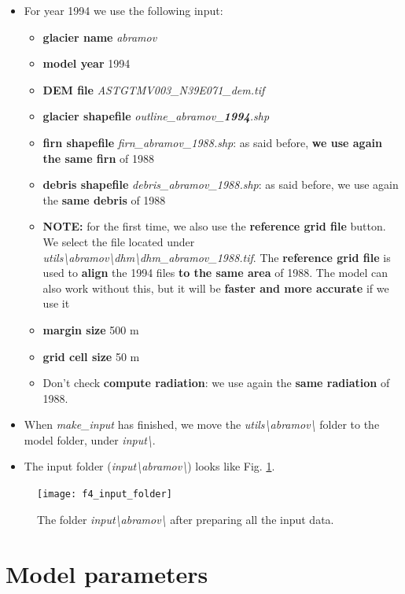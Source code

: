 \documentclass[15pt]{extarticle}
\begin{document}
\begin{itemize}
    \item For year 1994 we use the following input:
        \begin{itemize}
        \item \textbf{glacier name} \textit{abramov}
        \item\textbf{model year} 1994
        \item \textbf{DEM file} \textit{ASTGTMV003\_N39E071\_dem.tif}
        \item \textbf{glacier shapefile} \textit{outline\_abramov\_\textbf{1994}.shp}
        \item \textbf{firn shapefile} \textit{firn\_abramov\_1988.shp}: as said before, \textbf{we use again the same firn} of 1988
        \item \textbf{debris shapefile} \textit{debris\_abramov\_1988.shp}: as said before, we use again the \textbf{same debris} of 1988
        \item \textbf{NOTE:} for the first time, we also use the \textbf{reference grid file} button. We select the file located under \textit{utils\textbackslash abramov\textbackslash dhm\textbackslash dhm\_abramov\_1988.tif}. The \textbf{reference grid file} is used to \textbf{align} the 1994 files \textbf{to the same area} of 1988. The model can also work without this, but it will be \textbf{faster and more accurate} if we use it
        \item \textbf{margin size} 500 m
        \item \textbf{grid cell size} 50 m
        \item Don't check \textbf{compute radiation}: we use again the \textbf{same radiation} of 1988.
    \end{itemize}
    \item When \textit{make\_input} has finished, we move the \textit{utils\textbackslash abramov\textbackslash} folder to the model folder, under \textit{input\textbackslash}.
    \item The input folder (\textit{input\textbackslash abramov\textbackslash}) looks like Fig. \ref{fig:f4_input_folder}.
\end{itemize}

\begin{figure}[hb!]
    \centering
    \texttt{[image: f4\_input\_folder]}
    \caption{The folder \textit{input\textbackslash abramov\textbackslash} after preparing all the input data.}
    \label{fig:f4_input_folder}
\end{figure}


\clearpage
\section{Model parameters}
\end{document}

